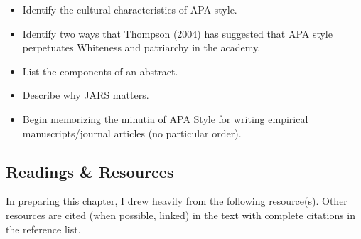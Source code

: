 \documentclass[
  11pt,
]{book}
\providecommand{\tightlist}{%
  \setlength{\itemsep}{0pt}\setlength{\parskip}{0pt}}
\begin{document}
\begin{itemize}
\tightlist
\item
  Identify the cultural characteristics of APA style.
\item
  Identify two ways that Thompson (2004) has suggested that APA style perpetuates Whiteness and patriarchy in the academy.
\item
  List the components of an abstract.
\item
  Describe why JARS matters.
\item
  Begin memorizing the minutia of APA Style for writing empirical manuscripts/journal articles (no particular order).
\end{itemize}

\hypertarget{readings-resources}{%
\subsection{Readings \& Resources}\label{readings-resources}}

In preparing this chapter, I drew heavily from the following resource(s). Other resources are cited (when possible, linked) in the text with complete citations in the reference list.
\end{document}
